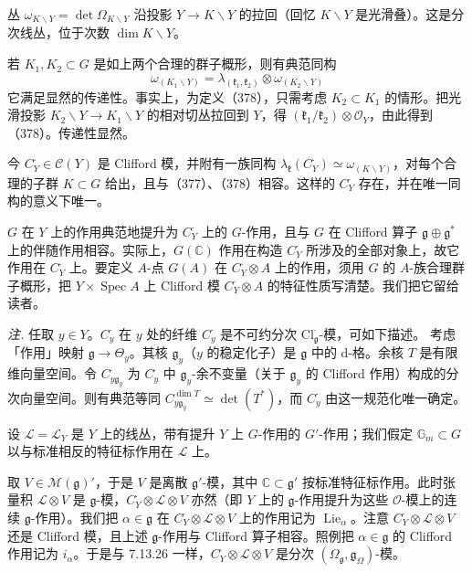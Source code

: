 丛 $\omega_{K\backslash Y}=\det\Omega_{K\backslash Y}$ 沿投影 $Y\to K\backslash Y$ 的拉回（回忆 $K\backslash Y$ 是光滑叠）。这是分次线丛，位于次数 $\dim K\backslash Y$。

若 $K_1,K_2\subset G$ 是如上两个合理的群子概形，则有典范同构
\begin{equation}\tag{378}
\omega_{(K_1\backslash Y)}=\lambda_{(\mathfrak{k}_1,\mathfrak{k}_2)}\otimes\omega_{(K_2\backslash Y)}
\end{equation}
它满足显然的传递性。事实上，为定义（378），只需考虑 $K_2\subset K_1$ 的情形。把光滑投影 $K_2\backslash Y\to K_1\backslash Y$ 的相对切丛拉回到 $Y$，得 $(\mathfrak{k}_1/\mathfrak{k}_2)\otimes\mathcal{O}_Y$，由此得到（378）。传递性显然。

今 $C_Y^{\cdot}\in\mathcal{C}(Y)$ 是 Clifford 模，并附有一族同构 $\lambda_{\mathfrak{k}}(C_Y^{\cdot})\simeq\omega_{(K\backslash Y)}$，对每个合理的子群 $K\subset G$ 给出，且与（377）、（378）相容。这样的 $C_Y^{\cdot}$ 存在，并在唯一同构的意义下唯一。

$G$ 在 $Y$ 上的作用典范地提升为 $C_Y^{\cdot}$ 上的 $G$-作用，且与 $G$ 在 Clifford 算子 $\mathfrak{g}\oplus\mathfrak{g}^{*}$ 上的伴随作用相容。实际上，$G(\mathbb{C})$ 作用在构造 $C_Y^{\cdot}$ 所涉及的全部对象上，故它作用在 $C_Y^{\cdot}$ 上。要定义 $A$-点 $G(A)$ 在 $C_Y^{\cdot}\otimes A$ 上的作用，须用 $G$ 的 $A$-族合理群子概形，把 $Y\times\operatorname{Spec}A$ 上 Clifford 模 $C_Y^{\cdot}\otimes A$ 的特征性质写清楚。我们把它留给读者。

\emph{注.} 任取 $y\in Y$。$C_y^{\cdot}$ 在 $y$ 处的纤维 $C_y^{\cdot}$ 是不可约分次 $\mathrm{Cl}^{\cdot}_{\mathfrak{g}}$-模，可如下描述。%
考虑「作用」映射 $\mathfrak{g}\to\Theta_y$。其核 $\mathfrak{g}_y$（$y$ 的稳定化子）是 $\mathfrak{g}$ 中的 d-格。余核 $T$ 是有限维向量空间。令 $C_{y\mathfrak{g}_y}^{\cdot}$ 为 $C_y^{\cdot}$ 中 $\mathfrak{g}_y$-余不变量（关于 $\mathfrak{g}_y$ 的 Clifford 作用）构成的分次向量空间。则有典范等同 $C_{y\mathfrak{g}_y}^{\dim T}\simeq\det(T^{*})$，而 $C_y^{\cdot}$ 由这一规范化唯一确定。

 设 $\mathcal{L}=\mathcal{L}_Y$ 是 $Y$ 上的线丛，带有提升 $Y$ 上 $G$-作用的 $G'$-作用；我们假定 $\mathbb{G}_m\subset G$ 以与标准相反的特征标作用在 $\mathcal{L}$ 上。

取 $V\in\mathcal{M}(\mathfrak{g})'$，于是 $V$ 是离散 $\mathfrak{g}'$-模，其中 $\mathbb{C}\subset\mathfrak{g}'$ 按标准特征标作用。此时张量积 $\mathcal{L}\otimes V$ 是 $\mathfrak{g}$-模，$C_Y^{\cdot}\otimes\mathcal{L}\otimes V$ 亦然（即 $Y$ 上的 $\mathfrak{g}$-作用提升为这些 $\mathcal{O}$-模上的连续 $\mathfrak{g}$-作用）。我们把 $\alpha\in\mathfrak{g}$ 在 $C_Y^{\cdot}\otimes\mathcal{L}\otimes V$ 上的作用记为 $\operatorname{Lie}_{\alpha}$。注意 $C_Y^{\cdot}\otimes\mathcal{L}\otimes V$ 还是 Clifford 模，且上述 $\mathfrak{g}$-作用与 Clifford 算子相容。照例把 $\alpha\in\mathfrak{g}$ 的 Clifford 作用记为 $i_{\alpha}$。于是与 7.13.26 一样，$C_Y^{\cdot}\otimes\mathcal{L}\otimes V$ 是分次 $(\Omega_{\mathfrak{g}},\mathfrak{g}_{\Omega})$-模。

